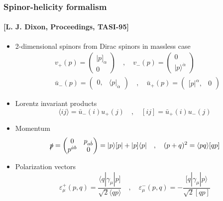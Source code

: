 \documentclass[english]{beamer}
\begin{document}
\begin{frame}[shrink=20]
\frametitle{Spinor-helicity formalism}
\framesubtitle{\tiny\color{blue}[L. J. Dixon, Proceedings, TASI-95]\color{black}\normalsize}
\begin{itemize}
\item<1-> 2-dimensional spinors from Dirac spinors in massless case
\begin{equation*}
\begin{split}
& v_+(p) = \begin{pmatrix}
|p]_\alpha \\ 0
\end{pmatrix} %
\quad,\quad
v_-(p) = \begin{pmatrix}
0 \\ |p\rangle^{\dot{\alpha}}
\end{pmatrix} %
\\
& \bar{u}_-(p) = \begin{pmatrix} 
0, & \langle p |_{\dot{\alpha}}\end{pmatrix}
\quad,\quad
\bar{u}_+(p) = \begin{pmatrix} [ p|^\alpha, & 0 \end{pmatrix}
\end{split}
\end{equation*} 

\item<2-> Lorentz invariant products
\begin{equation*}
 \langle ij \rangle = \bar{u}_-(i)u_+(j) 
\quad,\quad
 [ij] = \bar{u}_+(i)u_-(j)
\end{equation*}

\item<3-> Momentum
\begin{equation*}
\slashed{p} = \begin{pmatrix}
0 & p_{a\dot{b}} \\ 
p^{\dot{a}b} & 0
\end{pmatrix} = |p\rangle [p| + |p]\langle p|
\quad,\quad
(p+q)^2 = \langle pq\rangle[qp]
\end{equation*}

\item<4-> Polarization vectors
\begin{equation*}
\varepsilon^+_\mu (p, q) = \frac{\langle q | \gamma_\mu |p]}{\sqrt{2}\langle qp \rangle}
\quad,\quad
\varepsilon^-_\mu (p, q) = -\frac{[q|\gamma_\mu | p\rangle}{\sqrt{2}[qp]}
\end{equation*}

\end{itemize}

\end{frame}
\end{document}

